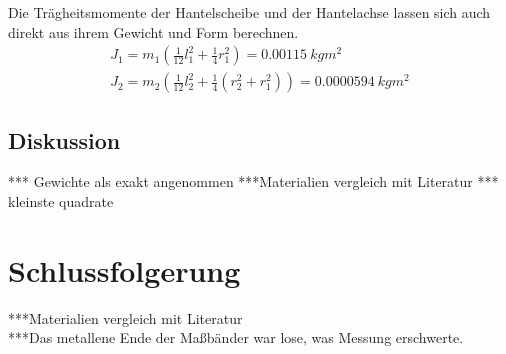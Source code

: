 \documentclass[
	a4paper,
	12pt,
	pagesize,
	ngerman
]{scrartcl}
\begin{document}
	Die Trägheitsmomente der Hantelscheibe und der Hantelachse lassen sich auch direkt aus ihrem Gewicht und Form berechnen.
	\begin{align}
		J_1 = m_1(\frac{1}{12}l_1^2+\frac{1}{4}r_1^2) = \SI{0,00115}{kgm^2}\\
		J_2 = m_2(\frac{1}{12}l_2^2+\frac{1}{4}(r_2^2 + r_1^2))= \SI{0,0000594}{kgm^2}
	\end{align}
	
	\subsection{Diskussion}
	*** Gewichte als exakt angenommen
	***Materialien vergleich mit Literatur
	*** kleinste quadrate
	
	\section{Schlussfolgerung}
	***Materialien vergleich mit Literatur \\
	***Das metallene Ende der Maßbänder war lose, was Messung erschwerte.
	
\end{document}
